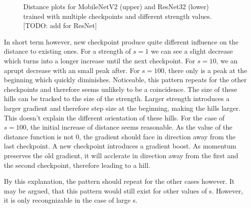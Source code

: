 \begin{figure}[h]
\begin{center}
        \caption{Distance plots for MobileNetV2 (upper) and ResNet32 (lower) trained with multiple checkpoints and different strength values. [TODO: add for ResNet]}
    \end{center}
\end{figure}

In short term however, new checkpoint produce quite different influence on the
distance to existing ones. For a strength of $s=1$ we can see a slight decrease
which turns into a longer increase until the next checkpoint. For $s=10$, we an
aprupt decrease with an small peak after. For $s=100$, there only is a peak at
the beginning which quickly diminishes. Noticeable, this pattern repeats for the
other checkpoints and therefore seems unlikely to be a coincidence. The size of
these hills can be tracked to the size of the strength. Larger strength
introduces a larger gradient and therefore step size at the beginning, making
the hills larger. This doesn't explain the different orientation of these hills.
For the case of $s=100$, the initial increase of distance seems reasonable. As
the value of the distance function is not 0, the gradient should face in
direction away from the last checkpoint. A new checkpoint introduces a gradient
boost. As momentum preserves the old gradient, it will acclerate in direction
away from the first and the second checkpoint, therefore leading to a hill.

By this explanation, the pattern should repeat for the other cases however. It
may be argued, that this pattern would still exist for other values of s.
However, it is only recongnizable in the case of large s.




